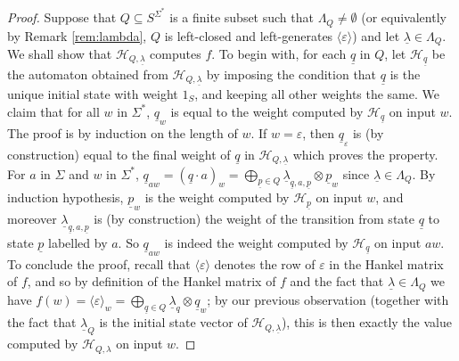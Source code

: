 \documentclass{lmcs}
\numberwithin{theorem}{section}
\begin{document}
\begin{proof}
Suppose that $Q \subseteq S^{\Sigma^*}$ is a finite subset such that $\Lambda_Q \neq \emptyset$ (or equivalently by Remark \ref{rem:lambda}, $Q$ is left-closed and left-generates $\langle \varepsilon \rangle$) and let $\underline{\lambda} \in \Lambda_{Q}$. We shall show that $\mathcal{H}_{Q, \underline{\lambda}}$ computes $f$. To begin with, for each $\underline{q}$ in $Q$, let $\mathcal{H}_{\underline{q}}$ be the automaton obtained from $\mathcal{H}_{Q,\underline{\lambda}}$ by imposing the condition that $\underline{q}$ is the unique initial state with weight $1_S$, and keeping all other weights the same. We claim that for all
$w$ in $\Sigma^*$, $\underline{q}_w$ is equal to the weight computed by $\mathcal{H}_{\underline{q}}$ on input $w$. The proof is by induction on the length of $w$. If $w=\varepsilon$, then $\underline{q}_\varepsilon$ is (by construction) equal to the final weight of $\underline{q}$ in $\mathcal{H}_{Q,\underline{\lambda}}$ which proves the property. For $a$ in $\Sigma$ and $w$ in $\Sigma^*$, $\underline{q}_{aw} = (\underline{q}\cdot a)_w = \bigoplus_{\underline{p} \in Q}  \underline{\lambda}_{\underline{q},a,\underline{p}} \otimes \underline{p}_w$ since $\underline{\lambda} \in \Lambda_Q$. By induction hypothesis, $\underline{p}_w$ is the weight computed by $\mathcal{H}_{\underline{p}}$ on input $w$, and moreover $\underline{\lambda}_{\underline{q},a,\underline{p}}$ is (by construction)  the weight of the transition from state $\underline{q}$ to state $\underline{p}$ labelled by $a$. So $\underline{q}_{aw}$ is indeed the weight computed by $\mathcal{H}_{\underline{q}}$ on input $aw$. To conclude the proof, recall that $\langle \varepsilon \rangle$ denotes the row of $\varepsilon$ in the Hankel matrix of $f$, and so by definition of the Hankel matrix of $f$ and the fact that $\underline{\lambda} \in \Lambda_Q$ we have $f(w) = \langle \varepsilon \rangle_w = \bigoplus_{\underline{q} \in Q} \underline{\lambda}_q \otimes \underline{q}_w$; by our previous observation (together with the fact that $\underline{\lambda}_Q$ is the initial state vector of $\mathcal{H}_{Q, \underline{\lambda}}$), this is then exactly the value computed by $\mathcal{H}_{Q, \lambda}$ on input $w$.
	

\end{proof}
\end{document}
